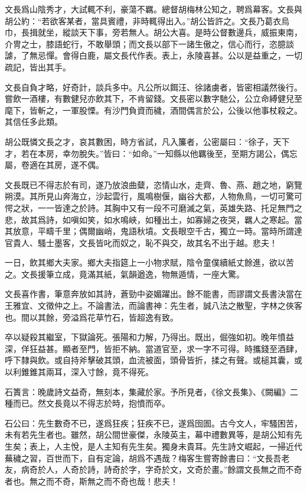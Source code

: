 \documentclass[12pt,a4paper]{ctexbook}
\begin{document}
文長爲山陰秀才，大試輒不利，豪蕩不羈。總督胡梅林公知之，聘爲幕客。文長與胡公約：“若欲客某者，當具賓禮，非時輒得出入。”胡公皆許之。文長乃葛衣烏巾，長揖就坐，縱談天下事，旁若無人。胡公大喜。是時公督數邊兵，威振東南，介冑之士，膝語蛇行，不敢舉頭；而文長以部下一諸生傲之，信心而行，恣臆談謔，了無忌憚。會得白鹿，屬文長代作表。表上，永陵喜甚。公以是益重之，一切疏記，皆出其手。\par
文長自負才略，好奇計，談兵多中。凡公所以餌汪、徐諸虜者，皆密相議然後行。嘗飲一酒樓，有數健兒亦飲其下，不肯留錢。文長密以數字馳公，公立命縛健兒至麾下，皆斬之，一軍股慄。有沙門負資而穢，酒間偶言於公，公後以他事杖殺之。其信任多此類。\par
胡公既憐文長之才，哀其數困，時方省試，凡入簾者，公密屬曰：“徐子，天下才，若在本房，幸勿脫失。”皆曰：“如命。”一知縣以他羈後至，至期方謁公，偶忘屬，卷適在其房，遂不偶。\par
文長既已不得志於有司，遂乃放浪曲糵，恣情山水，走齊、魯、燕、趙之地，窮覽朔漠。其所見山奔海立，沙起雲行，風鳴樹偃，幽谷大都，人物魚鳥，一切可驚可愕之狀，一一皆達之於詩。其胸中又有一段不可磨滅之氣，英雄失路、托足無門之悲，故其爲詩，如嗔如笑，如水鳴峽，如種出土，如寡婦之夜哭，羈人之寒起。當其放意，平疇千里；偶爾幽峭，鬼語秋墳。文長眼空千古，獨立一時。當時所謂達官貴人、騷士墨客，文長皆叱而奴之，恥不與交，故其名不出于越。悲夫！\par
一日，飲其鄉大夫家。鄉大夫指筵上一小物求賦，陰令童僕續紙丈餘進，欲以苦之。文長援筆立成，竟滿其紙，氣韻遒逸，物無遁情，一座大驚。\par
文長喜作書，筆意奔放如其詩，蒼勁中姿媚躍出。餘不能書，而謬謂文長書決當在王雅宜、文徵仲之上。不論書法，而論書神：先生者，誠八法之散聖，字林之俠客也。間以其餘，旁溢爲花草竹石，皆超逸有致。\par
卒以疑殺其繼室，下獄論死。張陽和力解，乃得出。既出，倔強如初。晚年憤益深，佯狂益甚。顯者至門，皆拒不納。當道官至，求一字不可得。時攜錢至酒肆，呼下隸與飲。或自持斧擊破其頭，血流被面，頭骨皆折，揉之有聲。或槌其囊，或以利錐錐其兩耳，深入寸餘，竟不得死。\par
石簣言：晚歲詩文益奇，無刻本，集藏於家。予所見者，《徐文長集》、《闕編》二種而已。然文長竟以不得志於時，抱憤而卒。\par
石公曰：先生數奇不已，遂爲狂疾；狂疾不已，遂爲囹圄。古今文人，牢騷困苦，未有若先生者也。雖然，胡公間世豪傑，永陵英主，幕中禮數異等，是胡公知有先生矣；表上，人主悅，是人主知有先生矣。獨身未貴耳。先生詩文崛起，一掃近代蕪穢之習，百世而下，自有定論，胡爲不遇哉？梅客生嘗寄餘書曰：“文長吾老友，病奇於人，人奇於詩，詩奇於字，字奇於文，文奇於畫。”餘謂文長無之而不奇者也。無之而不奇，斯無之而不奇也哉！悲夫！\par
\end{document}
